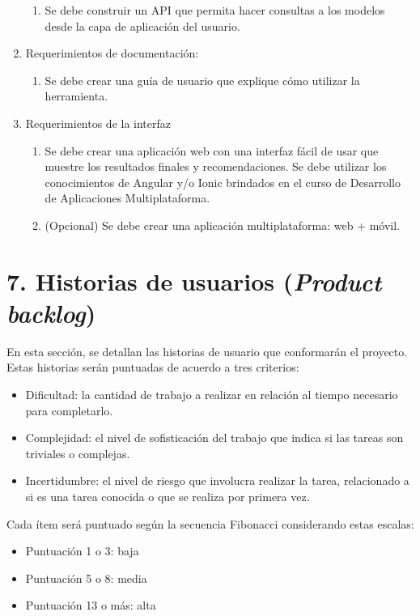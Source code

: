 \documentclass[
11pt, %
codirector, %
]{charter}
\begin{document}
\begin{enumerate}
\begin{enumerate}
                \item Se debe construir un API que permita hacer consultas a los modelos desde la capa de aplicación del usuario.
            \end{enumerate}
	\item Requerimientos de documentación:
		\begin{enumerate}
			\item Se debe crear una guía de usuario que explique cómo utilizar la herramienta.
		\end{enumerate}
	\item Requerimientos de la interfaz
 		\begin{enumerate}
			\item Se debe crear una aplicación web con una interfaz fácil de usar que muestre los resultados finales y recomendaciones. Se debe utilizar los conocimientos de Angular y/o Ionic brindados en el curso de Desarrollo de Aplicaciones Multiplataforma.
			\item (Opcional) Se debe crear una aplicación multiplataforma: web + móvil.
		\end{enumerate}

\end{enumerate}


\section{7. Historias de usuarios (\textit{Product backlog})}
\label{sec:backlog}

En esta sección, se detallan las historias de usuario que conformarán el proyecto. Estas historias serán puntuadas de acuerdo a tres criterios:
\begin{itemize}
    \item Dificultad: la cantidad de trabajo a realizar en relación al tiempo necesario para completarlo.
    \item Complejidad: el nivel de sofisticación del trabajo que indica si las tareas son triviales o complejas.
    \item Incertidumbre: el nivel de riesgo que involucra realizar la tarea, relacionado a si es una tarea conocida o que se realiza por primera vez.
\end{itemize}

Cada ítem será puntuado según la secuencia Fibonacci considerando estas escalas:
\begin{itemize}
    \item Puntuación 1 o 3: baja
    \item Puntuación 5 o 8: media
    \item Puntuación 13 o más: alta
\end{itemize}
\end{document}
